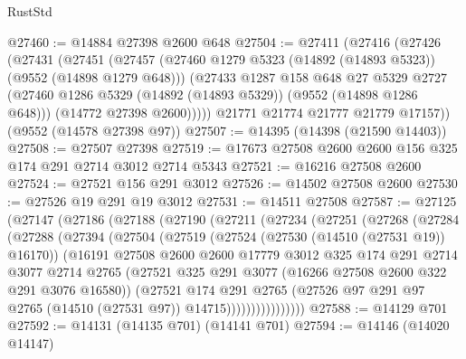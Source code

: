 \begin{lexlean}{RustStd}
\begin{coremodule}
@27460 := @14884 @27398 @2600 @648
@27504 := @27411
    (@27416
      (@27426
        (@27431
          (@27451
            (@27457
              (@27460 @1279 @5323 (@14892 (@14893 @5323)) (@9552 (@14898 @1279 @648)))
              (@27433
                @1287
                @158
                @648
                @27
                @5329
                @2727
                (@27460 @1286 @5329 (@14892 (@14893 @5329)) (@9552 (@14898 @1286 @648)))
                (@14772 @27398 @2600)))))
        @21771
        @21774
        @21777
        @21779
        @17157))
    (@9552 (@14578 @27398 @97))
@27507 := @14395 (@14398 (@21590 @14403))
@27508 := @27507 @27398
@27519 := @17673 @27508 @2600 @2600 @156 @325 @174 @291 @2714 @3012 @2714 @5343
@27521 := @16216 @27508 @2600
@27524 := @27521 @156 @291 @3012
@27526 := @14502 @27508 @2600
@27530 := @27526 @19 @291 @19 @3012
@27531 := @14511 @27508
@27587 := @27125
    (@27147
      (@27186
        (@27188
          (@27190
            (@27211
              (@27234
                (@27251
                  (@27268
                    (@27284
                      (@27288
                        (@27394
                          (@27504
                            (@27519
                              (@27524 (@27530 (@14510 (@27531 @19)) @16170))
                              (@16191
                                @27508
                                @2600
                                @2600
                                @17779
                                @3012
                                @325
                                @174
                                @291
                                @2714
                                @3077
                                @2714
                                @2765
                                (@27521
                                  @325
                                  @291
                                  @3077
                                  (@16266 @27508 @2600 @322 @291 @3076 @16580))
                                (@27521
                                  @174
                                  @291
                                  @2765
                                  (@27526
                                    @97
                                    @291
                                    @97
                                    @2765
                                    (@14510 (@27531 @97))
                                    @14715))))))))))))))))
@27588 := @14129 @701
@27592 := @14131 (@14135 @701) (@14141 @701)
@27594 := @14146 (@14020 @14147)

\end{coremodule}
\end{lexlean}
